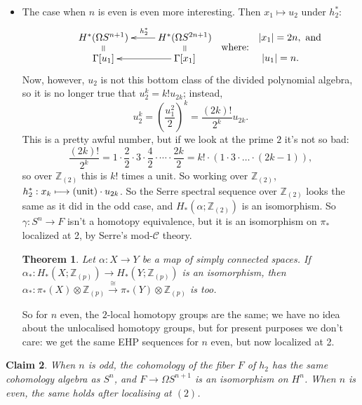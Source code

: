 \documentclass{article}
\newcommand{\Z}{\mathbb{Z}}
\newcommand{\Loops}{\Omega}
\renewcommand{\to}{\longrightarrow}
\renewcommand{\mapsto}{\longmapsto}
\newtheorem{thm}{Theorem}[section]
\newtheorem{claim}[thm]{Claim}
\theoremstyle{definition}
\begin{document}
\begin{itemize}
which \emph{are} homotopic by the Whitehead theorem; since $\tilde \gamma$ is equivariant with respect to deck transformations, $\gamma: F \to S^1$ is a homotopy equivalence (\textbf{I do not understand this}).  So now for n odd we have the homotopy fibration $S^n \to \Loops S^{n+1} \to \Loops S^{2n+1}$ whose long exact sequence is the EHP sequence
\[
\cdots \to \pi_i (S^n) \stackrel{e}{\to} \pi_{i+1} (S^{n+1}) \stackrel{h}{\to} \pi_{i+1} (S^{2n+1}) \stackrel{p}{\to} \pi_{i-1} (S^n) \stackrel{e}{\to} \pi_i (S^{n+1}) \to \cdots
\]
\item The case when $n$ is even is even more interesting. Then $x_1\mapsto u_2$ under $h_2^*$:
\[\xymatrix@R=.5em{
\ar@{=}[d]H^*(\Omega S^{n+1})&H^*(\Omega S^{2n+1})\ar[l]_{h_2^*}\ar@{=}[d]\\
\Gamma[u_1]&\Gamma[x_1]\ar[l]
}
\raisebox{-1em}{\ \ where:\ \ }
\xymatrix@R=.5em{
|x_1|=2n,\makebox[0cm][l]{ and }\\
|u_1|=n.
}
\]
Now, however, $u_2$ is not this bottom class of the divided polynomial algebra, so it is no longer true that $u_2^k = k! u_{2k}$; instead,
\[u_2^k=\left(\frac{u_1^2}{2}\right)^k=\frac{(2k)!}{2^k}u_{2k}.\]
This is a pretty awful number, but if we look at the prime $2$ it's not so bad:
\[
\frac{(2k)!}{2^k} = 1 \cdot \frac{2}{2} \cdot 3 \cdot \frac{4}{2} \cdot \cdots \cdot \frac{2k}{2} = k!\cdot(1\cdot3\cdot\ldots\cdot(2k-1))
,\]
so over $\Z_{(2)}$ this is $k!$ times a unit.  So working over $\Z_{(2)}$, $h_2^* : x_k \mapsto (\textup{unit})\cdot u_{2k}$.  So the Serre spectral sequence over $\Z_{(2)}$ looks the same as it did in the odd case, and $H_*(\alpha; \Z_{(2)})$ is an isomorphism.  So $\gamma: S^n \to F$ isn't a homotopy equivalence, but it is an isomorphism on $\pi_*$ localized at 2, by Serre's mod-$\mathscr{C}$ theory.
\begin{thm}
Let $\alpha: X \to Y$ be a map of simply connected spaces.  If $\alpha_*: H_*(X; \Z_{(p)}) \to H_*(Y; \Z_{(p)})$ is an isomorphism, then $\alpha_*: \pi_* (X) \otimes \Z_{(p)} \stackrel{\cong}{\to} \pi_* (Y) \otimes \Z_{(p)}$ is too.
\end{thm}
So for $n$ even, the $2$-local homotopy groups are the same; we have no idea about the unlocalised homotopy groups, but for present purposes we don't care: we get the same EHP sequences for $n$ even, but now localized at 2.
\end{itemize}
\begin{claim}\label{SerreSSEHPfiberArg}
When $n$ is odd, the cohomology of the fiber $F$ of $h_2$ has the same cohomology algebra as $S^n$, and $F\to \Omega S^{n+1}$ is an isomorphism on $H^n$. When $n$ is even, the same holds after localising at $(2)$.
\end{claim}
\end{document}
